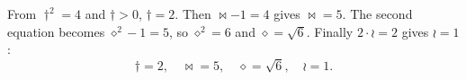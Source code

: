 From $\dagger^2=4$ and $\dagger>0$, $\dagger=2$. Then $\bowtie-1=4$ gives $\bowtie=5$. The second equation becomes $\diamond^2-1=5$, so $\diamond^2=6$ and $\diamond=\sqrt6$. Finally $2\cdot\wr=2$ gives $\wr=1$:
\[\boxed{\dagger=2,\quad\bowtie=5,\quad\diamond=\sqrt6,\quad\wr=1}.\]
